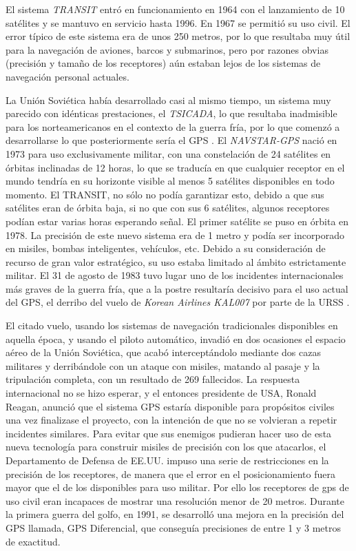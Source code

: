 El sistema \textit{TRANSIT} entró en funcionamiento en 1964 con el lanzamiento de 10 satélites y se mantuvo en servicio
hasta 1996. En 1967 se permitió su uso civil. El error típico de este sistema era de unos 250
metros, por lo que resultaba muy útil para la navegación de aviones, barcos y submarinos, pero
por razones obvias (precisión y tamaño de los receptores) aún estaban lejos de los sistemas de
navegación personal actuales.

La Unión Soviética había desarrollado casi al mismo tiempo, un sistema muy parecido con
idénticas prestaciones, el \textit{TSICADA}, lo que resultaba inadmisible para los norteamericanos en el
contexto de la guerra fría, por lo que comenzó a desarrollarse lo que posteriormente sería el
\ac{GPS} \cite{Pala10}.
El \textit{NAVSTAR-GPS} nació en 1973 para uso exclusivamente militar, con una constelación de 24
satélites en órbitas inclinadas de 12 horas, lo que se traducía en que cualquier receptor en el
mundo tendría en su horizonte visible al menos 5 satélites disponibles en todo momento. El
TRANSIT, no sólo no podía garantizar esto, debido a que sus satélites eran de órbita baja, si no
que con sus 6 satélites, algunos receptores podían estar varias horas esperando señal. El primer
satélite se puso en órbita en 1978. La precisión de este nuevo sistema era de 1 metro y podía
ser incorporado en misiles, bombas inteligentes, vehículos, etc. Debido a su consideración de
recurso de gran valor estratégico, su uso estaba limitado al ámbito estrictamente militar.
El 31 de agosto de 1983 tuvo lugar uno de los incidentes internacionales más graves de la
guerra fría, que a la postre resultaría decisivo para el uso actual del \ac{GPS}, el derribo del vuelo de
\textit{Korean Airlines KAL007} por parte de la \ac{URSS} \cite{Kore15}.

El citado vuelo, usando los sistemas de navegación tradicionales disponibles en aquella época, y
usando el piloto automático, invadió en dos ocasiones el espacio aéreo de la Unión Soviética,
que acabó interceptándolo mediante dos cazas militares y derribándole con un ataque con
misiles, matando al pasaje y la tripulación completa, con un resultado de 269 fallecidos.
La respuesta internacional no se hizo esperar, y el entonces presidente de \ac{USA}, Ronald Reagan,
anunció que el sistema \ac{GPS} estaría disponible para propósitos civiles una vez finalizase el
proyecto, con la intención de que no se volvieran a repetir incidentes similares.
Para evitar que sus enemigos pudieran hacer uso de esta nueva tecnología para construir
misiles de precisión con los que atacarlos, el Departamento de Defensa de \ac{EE.UU.} impuso una
serie de restricciones en la precisión de los receptores, de manera que el error en el
posicionamiento fuera mayor que el de los disponibles para uso militar. Por ello los receptores de gps de uso
civil eran incapaces de mostrar una resolución menor de 20 metros.
Durante la primera guerra del golfo, en 1991, se desarrolló una mejora en la precisión del \ac{GPS}
llamada, \ac{GPS} Diferencial, que conseguía precisiones de entre 1 y 3 metros de exactitud.



